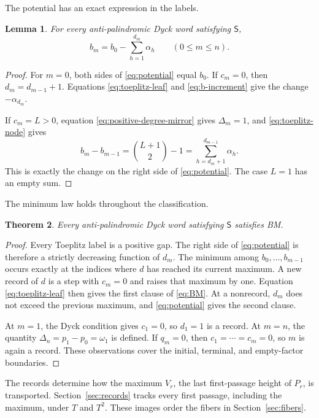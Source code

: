 \documentclass[11pt]{article}
\newtheorem{theorem}{Theorem}[section]
\newtheorem{lemma}[theorem]{Lemma}
\theoremstyle{definition}
\theoremstyle{remark}
\begin{document}
The potential has an exact expression in the labels.
\begin{lemma}

For every anti-palindromic Dyck word satisfying \(\mathsf S\),
\begin{equation}
\label{eq:potential}
 b_m=b_0-\sum_{h=1}^{d_m}\alpha_h
 \qquad(0\leq m\leq n).
\end{equation}
\end{lemma}

\begin{proof}
For \(m=0\), both sides of \eqref{eq:potential} equal \(b_0\).  If \(c_m=0\), then
\(d_m=d_{m-1}+1\).  Equations \eqref{eq:toeplitz-leaf} and
\eqref{eq:b-increment} give the change \(-\alpha_{d_m}\).

If \(c_m=L>0\), equation \eqref{eq:positive-degree-mirror} gives
\(\Delta_m=1\), and \eqref{eq:toeplitz-node} gives
\[
 b_m-b_{m-1}
 =\binom{L+1}{2}-1
 =\sum_{h=d_m+1}^{d_{m-1}}\alpha_h.
\]
This is exactly the change on the right side of \eqref{eq:potential}.  The
case \(L=1\) has an empty sum.
\end{proof}

The minimum law holds throughout the classification.
\begin{theorem}
\label{thm:ASBM}
Every anti-palindromic Dyck word satisfying \(\mathsf S\) satisfies BM.
\end{theorem}

\begin{proof}
Every Toeplitz label is a positive gap.  The right side of
\eqref{eq:potential} is therefore a strictly decreasing function of \(d_m\).
The minimum among \(b_0,\ldots,b_{m-1}\) occurs exactly at the indices where
\(d\) has reached its current maximum.  A new record of \(d\) is a step with
\(c_m=0\) and raises that maximum by one.  Equation
\eqref{eq:toeplitz-leaf} then gives the first clause of \eqref{eq:BM}.  At a
nonrecord, \(d_m\) does not exceed the previous maximum, and
\eqref{eq:potential} gives the second clause.

At \(m=1\), the Dyck condition gives \(c_1=0\), so \(d_1=1\) is a record.  At
\(m=n\), the quantity \(\Delta_n=p_1-p_0=\omega_1\) is defined.  If \(q_m=0\),
then \(c_1=\cdots=c_m=0\), so \(m\) is again a record.  These observations
cover the initial, terminal, and empty-factor boundaries.
\end{proof}

The records determine how the maximum \(V_r\), the last first-passage height
of \(P_r\), is transported.  Section~\ref{sec:records} tracks every first
passage, including the maximum, under \(T\) and \(T^2\).  These images order
the fibers in Section~\ref{sec:fibers}.
\end{document}
